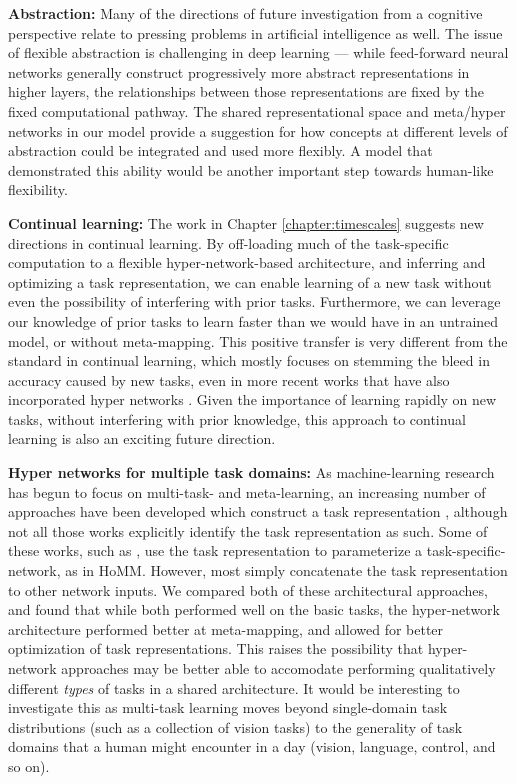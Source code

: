 \textbf{Abstraction:} Many of the directions of future investigation from a cognitive perspective relate to pressing problems in artificial intelligence as well. The issue of flexible abstraction is challenging in deep learning --- while feed-forward neural networks generally construct progressively more abstract representations in higher layers, the relationships between those representations are fixed by the fixed computational pathway. The shared representational space and meta/hyper networks in our model provide a suggestion for how concepts at different levels of abstraction could be integrated and used more flexibly. A model that demonstrated this ability would be another important step towards human-like flexibility. \par 

\textbf{Continual learning:} The work in Chapter \ref{chapter:timescales} suggests new directions in continual learning. By off-loading much of the task-specific computation to a flexible hyper-network-based architecture, and inferring and optimizing a task representation, we can enable learning of a new task without even the possibility of interfering with prior tasks. Furthermore, we can leverage our knowledge of prior tasks to learn faster than we would have in an untrained model, or without meta-mapping. This positive transfer is very different from the standard in continual learning, which mostly focuses on stemming the bleed in accuracy caused by new tasks, even in more recent works that have also incorporated hyper networks \citep{Oswald2020}. Given the importance of learning rapidly on new tasks, without interfering with prior knowledge, this approach to continual learning is also an exciting future direction. \par 

\textbf{Hyper networks for multiple task domains:} As machine-learning research has begun to focus on multi-task- and meta-learning, an increasing number of approaches have been developed which construct a task representation \citep{Hermann2017, Zintgraf2018, Rusu2019}, although not all those works explicitly identify the task representation as such. Some of these works, such as  \citet{Rusu2019}, use the task representation to parameterize a task-specific-network, as in HoMM. However, most simply concatenate the task representation to other network inputs. We compared both of these architectural approaches, and found that while both performed well on the basic tasks, the hyper-network architecture performed better at meta-mapping, and allowed for better optimization of task representations. This raises the possibility that hyper-network approaches may be better able to accomodate performing qualitatively different \emph{types} of tasks in a shared architecture. It would be interesting to investigate this as multi-task learning moves beyond single-domain task distributions (such as a collection of vision tasks) to the generality of task domains that a human might encounter in a day (vision, language, control, and so on). 

